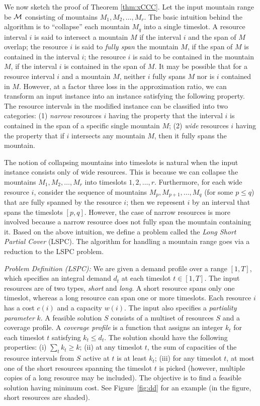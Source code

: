 \documentclass[11pt]{article}
\newcommand{\lspc}{{\sc LSPC}}
\newcommand{\calM} {{\cal M}}
\begin{document}
We now sketch the proof of Theorem \ref{thm:xCCC}. 
Let the input mountain range be ${\calM}$ consisting of mountains $M_1,M_2, \ldots, M_r$.
The basic intuition behind the algorithm is to ``collapse'' each mountain $M_q$ into a single timeslot. 
A resource interval $i$ is said to intersect a mountain $M$ if the interval $i$ and the span of 
$M$ overlap; the resource $i$ is said to {\em fully span} the mountain $M$, if 
the span of $M$ is contained in the interval $i$; the resource $i$ is said to
be contained in the mountain $M$, if the interval $i$ is contained in the span of $M$.
It may be possible that for a resource interval $i$ and a mountain $M$,
neither $i$ fully spans $M$ nor is $i$ contained in $M$.
However, at a factor three loss in the approximation ratio, we can transform an input instance into an instance
satisfying the following property. The resource intervals in the modified instance can be 
classified into two categories: (1) {\em narrow} resources $i$ having the property
that the interval $i$ is contained in the span of a specific single mountain $M$;
(2) {\em wide} resources $i$ having the property that 
if $i$ intersects any mountain $M$, then it fully spans the mountain. 

The notion of collapsing mountains into timeslots is natural when the input instance 
consists only of wide resources. 
This is because we can collapse the mountains $M_1, M_2, \ldots, M_r$ into timeslots $1, 2, \ldots, r$.  
Furthermore, for each wide resource $i$, consider the sequence of mountains 
$M_p, M_{p+1}, \ldots, M_q$ (for some $p \leq q$) that are fully spanned by the resource $i$;
then we represent $i$ by an interval that spans the timeslots $[p,q]$. 
However, the case of narrow resources is more involved
because a narrow resource does not fully span the mountain containing it. 
Based on the above intuition, we define a problem called the {\em Long Short Partial Cover} (\lspc).
The algorithm for handling a mountain range goes via a reduction to the {\lspc} problem.

{\it  Problem Definition (\lspc):} 
We are given a demand profile over a range $[1,T]$, 
which specifies an integral demand $d_t$ at each timeslot $t\in [1,T]$.
The input resources are of two types, {\em short} and {\em long}. 
A short resource spans only one timeslot, whereas a long resource can span one or more timeslots.
Each resource $i$ has a cost $c(i)$ and a capacity $w(i)$. 
The input also specifies a {\em partiality parameter} $k$. 
A feasible solution $S$ consists of a multiset of resources $S$ and a coverage profile.
A {\em coverage profile} is a function that assigns
an integer $k_t$ for each timeslot $t$ satisfying $k_t \leq d_t$.
The solution should have the following properties: 
(i) $\sum_t k_t \geq k$;
(ii) at any timeslot $t$, the sum of capacities of the resource intervals from $S$ active at $t$ is at least $k_t$;
(iii) for any timeslot $t$, at most one of the short resources spanning the timeslot $t$ 
is picked (however, multiple copies of a long resource may be included). 
The objective is to find a feasible solution having minimum cost. 
See Figure~\ref{fig:dd} for an example (in the figure, short resources are shaded).
\end{document}
